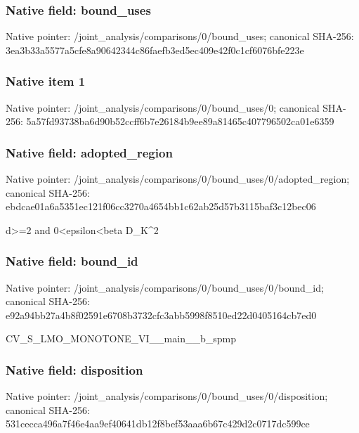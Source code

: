 \documentclass[10pt,a4paper]{article}
\begin{document}
\subsubsection{Native field: bound\_\allowbreak{}uses}
Native pointer: /joint\_\allowbreak{}analysis/comparisons/0/bound\_\allowbreak{}uses; canonical SHA-256: 3ea3b33a5577a5cfe8a90642344c86faefb3ed5ec409e42f0c1cf6076bfe223e

\subsubsection{Native item 1}
Native pointer: /joint\_\allowbreak{}analysis/comparisons/0/bound\_\allowbreak{}uses/0; canonical SHA-256: 5a57fd93738ba6d90b52ccff6b7e26184b9ee89a81465c407796502ca01e6359

\subsubsection{Native field: adopted\_\allowbreak{}region}
Native pointer: /joint\_\allowbreak{}analysis/comparisons/0/bound\_\allowbreak{}uses/0/adopted\_\allowbreak{}region; canonical SHA-256: ebdcae01a6a5351ec121f06cc3270a4654bb1c62ab25d57b3115baf3c12bec06

\begingroup\raggedright\sloppy d>=\allowbreak{}2 and 0<epsilon<beta D\_\allowbreak{}K\textasciicircum{}2\par\endgroup

\subsubsection{Native field: bound\_\allowbreak{}id}
Native pointer: /joint\_\allowbreak{}analysis/comparisons/0/bound\_\allowbreak{}uses/0/bound\_\allowbreak{}id; canonical SHA-256: e92a94bb27a4b8f02591e6708b3732cfc3abb5998f8510ed22d0405164cb7ed0

\begingroup\raggedright\sloppy CV\_\allowbreak{}S\_\allowbreak{}LMO\_\allowbreak{}MONOTONE\_\allowbreak{}VI\_\allowbreak{}\_\allowbreak{}main\_\allowbreak{}\_\allowbreak{}b\_\allowbreak{}spmp\par\endgroup

\subsubsection{Native field: disposition}
Native pointer: /joint\_\allowbreak{}analysis/comparisons/0/bound\_\allowbreak{}uses/0/disposition; canonical SHA-256: 531cecca496a7f46e4aa9ef40641db12f8bef53aaa6b67c429d2c0717dc599ce
\end{document}
